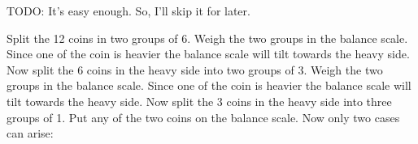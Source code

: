 \documentclass[titlepage,12pt]{book}
\begin{document}
\mainmatter

\begin{solution}
\end{solution}


\begin{solution}
    TODO: It's easy enough. So, I'll skip it for later.
\end{solution}

\begin{solution}
\end{solution}

\begin{solution}
    Split the 12 coins in two groups of 6.
    Weigh the two groups in the balance scale.
    Since one of the coin is heavier the 
    balance scale will tilt towards the heavy side.
    Now split the 6 coins in the heavy side into two groups of 3.
    Weigh the two groups in the balance scale.
    Since one of the coin is heavier the 
    balance scale will tilt towards the heavy side.
    Now split the 3 coins in the heavy side into three groups of 1.
    Put any of the two coins on the balance scale. Now only two cases can arise:
\end{solution}

\begin{solution}
    
\end{solution}
\end{document}

